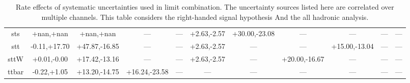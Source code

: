 \begin{table}
\begin{center}
\begin{small}
{\begin{tabular}{c||c|c|c|c|c|c|c|c|c|c}
sts & +nan,+nan & +nan,+nan & --- & --- & +2.63,-2.57 & +30.00,-23.08 & --- & --- & --- & ---\\  
stt & -0.11,+17.70 & +47.87,-16.85 & --- & --- & +2.63,-2.57 & --- & --- & +15.00,-13.04 & --- & ---\\  
sttW & +0.01,-0.00 & +17.42,-13.16 & --- & --- & +2.63,-2.57 & --- & +20.00,-16.67 & --- & --- & ---\\  
ttbar & -0.22,+1.05 & +13.20,-14.75 & +16.24,-23.58 & --- & --- & --- & --- & --- & --- & ---\\
\hline
\end{tabular}
}
\caption{Rate effects of systematic uncertainties used in limit combination.  The uncertainty sources listed here are correlated over multiple channels.  This table considers the right-handed signal hypothesis
And the all hadronic analysis.}
\label{table:bsRsysCoH}

\end{small}
\end{center}
\end{table}




